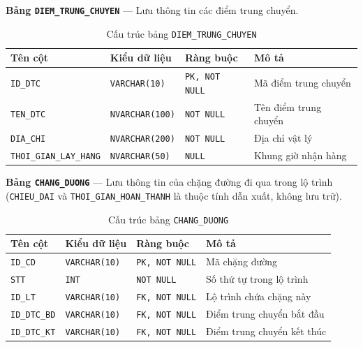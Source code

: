 \documentclass[11pt]{report}
\begin{document}
\noindent\textbf{Bảng \texttt{DIEM\_TRUNG\_CHUYEN}} --- Lưu thông tin các điểm trung chuyển.
\begin{table}[H]
    \centering
    \renewcommand{\tabularxcolumn}[1]{m{#1}}
    \begin{tabularx}{\textwidth}{|l|l|l|X|} \hline
        \rowcolor{teal!30}
        \textbf{Tên cột} & \textbf{Kiểu dữ liệu} & \textbf{Ràng buộc} & \textbf{Mô tả} \\ \hline
        \texttt{ID\_DTC}               & \texttt{VARCHAR(10)}   & \texttt{PK, NOT NULL}  & Mã điểm trung chuyển \\ \hline
        \texttt{TEN\_DTC}              & \texttt{NVARCHAR(100)} & \texttt{NOT NULL}      & Tên điểm trung chuyển \\ \hline
        \texttt{DIA\_CHI}              & \texttt{NVARCHAR(200)} & \texttt{NOT NULL}      & Địa chỉ vật lý \\ \hline
        \texttt{THOI\_GIAN\_LAY\_HANG} & \texttt{NVARCHAR(50)}  & \texttt{NULL}          & Khung giờ nhận hàng \\ \hline
    \end{tabularx}
    \caption{Cấu trúc bảng \texttt{DIEM\_TRUNG\_CHUYEN}}
    \label{tab:str_dtc}
\end{table}

\noindent\textbf{Bảng \texttt{CHANG\_DUONG}} --- Lưu thông tin của chặng đường đi qua trong lộ trình (\texttt{CHIEU\_DAI} và \texttt{THOI\_GIAN\_HOAN\_THANH} là thuộc tính dẫn xuất, không lưu trữ).
\begin{table}[H]
    \centering
    \renewcommand{\tabularxcolumn}[1]{m{#1}}
    \begin{tabularx}{\textwidth}{|l|l|l|X|} \hline
        \rowcolor{teal!30}
        \textbf{Tên cột} & \textbf{Kiểu dữ liệu} & \textbf{Ràng buộc} & \textbf{Mô tả} \\ \hline
        \texttt{ID\_CD}      & \texttt{VARCHAR(10)} & \texttt{PK, NOT NULL}  & Mã chặng đường \\ \hline
        \texttt{STT}         & \texttt{INT}         & \texttt{NOT NULL}      & Số thứ tự trong lộ trình \\ \hline
        \texttt{ID\_LT}      & \texttt{VARCHAR(10)} & \texttt{FK, NOT NULL}  & Lộ trình chứa chặng này \\ \hline
        \texttt{ID\_DTC\_BD} & \texttt{VARCHAR(10)} & \texttt{FK, NOT NULL}  & Điểm trung chuyển bắt đầu \\ \hline
        \texttt{ID\_DTC\_KT} & \texttt{VARCHAR(10)} & \texttt{FK, NOT NULL}  & Điểm trung chuyển kết thúc \\ \hline
    \end{tabularx}
    \caption{Cấu trúc bảng \texttt{CHANG\_DUONG}}
    \label{tab:str_changduong}
\end{table}
\end{document}
